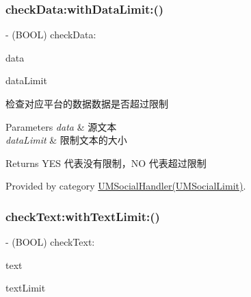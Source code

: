 \subsubsection{\texorpdfstring{check\+Data\+:with\+Data\+Limit\+:()}{checkData:withDataLimit:()}\hspace{0.1cm}{\footnotesize\ttfamily [2/2]}}
{\footnotesize\ttfamily -\/ (B\+O\+OL) check\+Data\+: \begin{DoxyParamCaption}\item[{(N\+S\+Data $\ast$)}]{data }\item[{withDataLimit:(N\+S\+U\+Integer)}]{data\+Limit }\end{DoxyParamCaption}}

检查对应平台的数据数据是否超过限制


\begin{DoxyParams}{Parameters}
{\em data} & 源文本 \\
\hline
{\em data\+Limit} & 限制文本的大小\\
\hline
\end{DoxyParams}
\begin{DoxyReturn}{Returns}
Y\+ES 代表没有限制，\+NO 代表超过限制 
\end{DoxyReturn}


Provided by category \mbox{\hyperlink{category_u_m_social_handler_07_u_m_social_limit_08_aa40a617ff5de296f940d1bb9de9ca9d6}{U\+M\+Social\+Handler(\+U\+M\+Social\+Limit)}}.

\mbox{\label{interface_u_m_social_handler_a50a70e47f3feb853f947b55aebf3dde2}} 
\subsubsection{\texorpdfstring{check\+Text\+:with\+Text\+Limit\+:()}{checkText:withTextLimit:()}\hspace{0.1cm}{\footnotesize\ttfamily [1/2]}}
{\footnotesize\ttfamily -\/ (B\+O\+OL) check\+Text\+: \begin{DoxyParamCaption}\item[{(N\+S\+String $\ast$)}]{text }\item[{withTextLimit:(N\+S\+U\+Integer)}]{text\+Limit }\end{DoxyParamCaption}}

